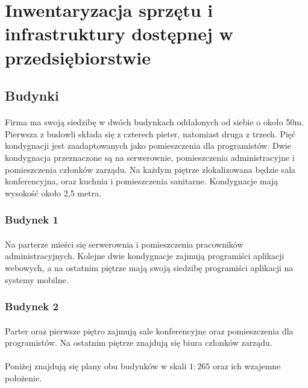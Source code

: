 \section{Inwentaryzacja sprzętu i infrastruktury dostępnej w przedsiębiorstwie}
\subsection{Budynki}
\paragraph{}
Firma ma swoją siedzibę w dwóch budynkach oddalonych od siebie o około 50m. Pierwsza z budowli składa się z czterech pieter, natomiast druga z trzech. Pięć kondygnacji jest zaadaptowanych jako pomieszczenia dla programistów. Dwie kondygnacja przeznaczone są na serwerownie, pomieszczenia administracyjne i  pomieszczenia członków zarządu. Na każdym piętrze zlokalizowana będzie sala konferencyjna, oraz kuchnia i pomieszczenia sanitarne. Kondygnacje mają wysokość około 2,5 metra.
\paragraph{}
\subsubsection{Budynek 1}
\paragraph{}
Na parterze mieści się serwerownia i pomieszczenia pracowników administracyjnych. Kolejne dwie kondygnacje zajmują programiści aplikacji webowych, a na ostatnim piętrze mają swoją siedzibę programiści aplikacji na systemy mobilne.

\subsubsection{Budynek 2}
\paragraph{}
Parter oraz pierwsze piętro zajmują sale konferencyjne oraz pomieszczenia dla programistów. Na ostatnim piętrze znajdują się biura członków zarządu.

\paragraph{}
Poniżej znajdują się plany obu budynków w skali $1:265$ oraz ich wzajemne położenie.

